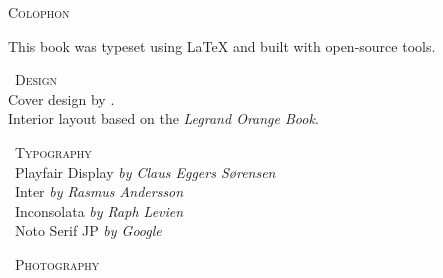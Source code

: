 \cleardoublepage
  \thispagestyle{empty}

  \sffamily

  \vspace*{2cm}

  \begin{center}
    {\Large\textsc{Colophon}}

    \vspace{0.3cm}
    \quad{}\quad{}
  \end{center}

  \vspace{1.5cm}

  \noindent
  This book was typeset using {\LaTeX} and built with open-source tools.

  \vspace{0.8cm}

  \noindent
  {\small\textsc{\faObjectGroup\ Design}}\\[0.5em]
  Cover design by \theauthor.\\[0.1em]
  Interior layout based on the \textit{Legrand Orange Book}.

  \vspace{0.8cm}

  \noindent
  {\small\textsc{\faFont\ Typography}}\\[0.5em]
  \noindent
   \textemdash\ Playfair Display \textit{\footnotesize by Claus Eggers Sørensen} \\
   \textemdash\ Inter \textit{\footnotesize by Rasmus Andersson} \\
   \textemdash\ Inconsolata \textit{\footnotesize by Raph Levien} \\
   \textemdash\ Noto Serif JP \textit{\footnotesize by Google} \\

  \ifdefined\photographycredits
    \vspace{0.8cm}

    \noindent
    {\small\textsc{\faCamera\ Photography}}\\[0.5em]
    \photographycredits
  \fi

  \vfill
  \begin{center}
  \end{center}

  \normalfont
  \normalsize
  \restoregeometry
  \clearpage